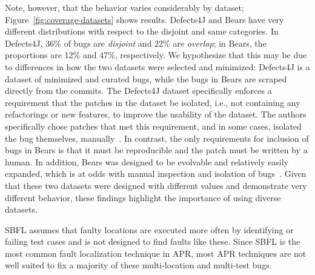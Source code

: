 
Note, however, that the behavior varies considerably by dataset;
Figure~\ref{fig:coverage-datasets} shows results.  Defects4J and 
Bears have very different distributions with respect to the 
disjoint and same categories. In Defects4J, 36\% of bugs are \emph{disjoint} and 
22\% are \emph{overlap}; in Bears, the proportions are 12\% and 47\%, respectively.
We hypothesize that this may be due to differences in how the two  
datasets were selected and minimized: Defects4J is a dataset of minimized and curated 
bugs, while the bugs in Bears are scraped directly from the
commits. The Defects4J dataset specifically enforces a requirement that the patches in the 
dataset be isolated, i.e., not containing any refactorings or new features, to improve the 
usability of the dataset. The authors specifically chose patches that met this requirement, 
and in some cases, isolated the bug themselves, manually~\cite{defects4j}. In contrast, the 
only requirements for inclusion of bugs in Bears is that it must be reproducible and 
the patch must be written by a human. In addition, Bears was designed to be evolvable 
and relatively easily expanded, which is at odds with manual inspection and isolation of 
bugs~\cite{bears}.
Given that these two datasets were designed with different values and demonstrate very 
different behavior, these findings highlight the importance of using diverse datasets. 

  

SBFL assumes that faulty locations are executed more often by identifying 
or failing test cases and is not designed to find faults like these. Since SBFL 
is the most common fault localization technique in APR, most APR techniques 
are not well suited to fix a majority of these multi-location and multi-test 
bugs.



%

